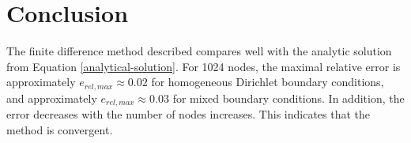 \documentclass[11pt,a4paper,english]{elsarticle}%
\begin{document}
\section{Conclusion}
The finite difference method described compares well with the analytic solution from Equation \eqref{analytical-solution}. For 1024 nodes, the maximal relative error is approximately $e_{rel,max} \approx 0.02$ for homogeneous Dirichlet boundary conditions, and approximately $e_{rel,max} \approx 0.03$ for mixed boundary conditions. In addition, the error decreases with  the number of nodes increases. This indicates that the method is convergent.
	


\end{document}

